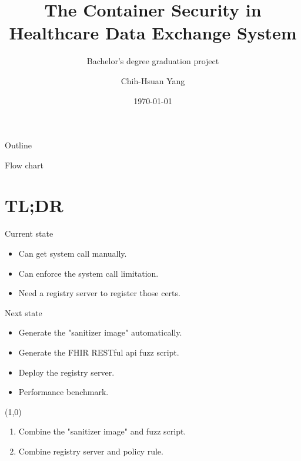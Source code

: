 \documentclass{beamer}
\title{The Container Security in Healthcare Data Exchange System}
\subtitle{Bachelor's degree graduation project}
\author{Chih-Hsuan Yang}
\institute{National Sun Yat-sen University\\
Advisor: Chun-I Fan
}
\date{\today}
\begin{document}
\begin{CJK*}{UTF8}{bsmi}

  \begin{frame}
    \titlepage
  \end{frame}


  \begin{frame}{Outline}
    \begin{multicols}{2}
      \tableofcontents
    \end{multicols}
  \end{frame}

  \begin{frame}{Flow chart}
    \centering
    \scalebox{0.9} {
    }
  \end{frame}

  \section{TL;DR}
  \begin{frame}{Current state}
    \Large
    \begin{itemize}
      \item Can get system call manually.
      \item Can enforce the system call limitation.
      \item Need a registry server to register those certs.
    \end{itemize}
  \end{frame}

  \begin{frame}{Next state}
    \Large
    \begin{itemize}
      \item Generate the "sanitizer image" automatically.
      \item Generate the FHIR RESTful api fuzz script.
      \item Deploy the registry server.
      \item Performance benchmark.
    \end{itemize}
    \line(1,0){\textwidth}
    \begin{enumerate}
      \item Combine the "sanitizer image" and fuzz script.
      \item Combine registry server and policy rule.
    \end{enumerate}
  \end{frame}


\end{CJK*}
\end{document}
